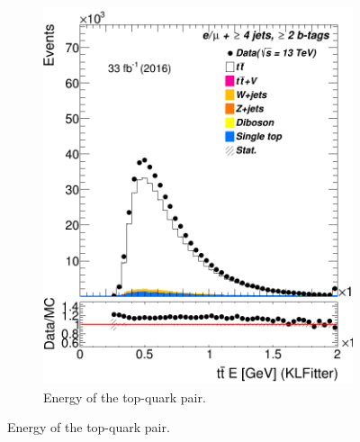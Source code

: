\begin{figure}
\begin{subfigure}{0.25\textwidth}
		\includegraphics[width=\linewidth]{ControlPlots_emujets_2016_4incl_2incl/klf_ttbar_E_emujets_2016.png}
		\caption{Energy of the top-quark pair.} \label{fig:K17}
	\end{subfigure}



\end{figure}
